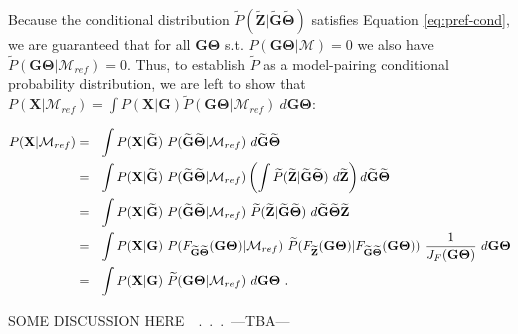 \documentclass[11pt]{article}
\newcommand{\vect}[1]{\boldsymbol{\mathbf{#1}}}
\newcommand{\ignore}[1]{}
\newcommand{\X}{\vect{X}}
\newcommand{\M}{\mathcal{M}}
\newcommand{\G}{\vect{G}}
\newcommand{\T}{\vect{\Theta}}
\newcommand{\GT}{\G\T}
\newcommand{\Mref}{\M_{ref}}
\newcommand{\Pref}{\widetilde{P}}
\newcommand{\GTref}{\widetilde{\GT}}
\newcommand{\Gref}{\widetilde{\G}}
\newcommand{\Tref}{\widetilde{\T}}
\newcommand{\Z}{\vect{Z}}
\newcommand{\Zref}{\widetilde{\Z}}
\begin{document}
Because the conditional distribution $\Pref(\Zref|\Gref\Tref)$ satisfies Equation \ref{eq:pref-cond},
we are guaranteed that for all $\GT$ s.t. $P(\GT|\M)=0$ we also have $\Pref(\GT|\Mref)=0$.
%
Thus, to establish $\Pref$ as a model-pairing conditional probability distribution, we are left to show that $P(\X|\Mref) = \int P(\X|\G) \Pref(\GT|\Mref)\ d\GT$:
%
%
\begin{small}
\begin{align}
P(\X|\Mref)
&=~~ \int P(\X|\Gref)\ P(\Gref\Tref|\Mref)\ d\Gref\Tref  \notag \\ %
&=~~ \int P(\X|\Gref)\ P(\Gref\Tref|\Mref)  %
\left( \int \Pref(\Zref|\Gref\Tref)\ d\Zref\right)d\Gref\Tref \notag \\ 
&=~~ \int P(\X|\Gref)\ P(\Gref\Tref|\Mref)\ \Pref(\Zref|\Gref\Tref)\ d\Gref\Tref\Zref \notag \\ 
&=~~ \int P(\X|\G)\ P(F_{\Gref\Tref}(\GT)|\Mref)\ \Pref(F_{\Zref}(\GT)|F_{\Gref\Tref}(\GT))\ \frac{1} {J_F(\GT)}\  d\GT \notag \\ 
&=~~ \int P(\X|\G)\ \Pref(\GT|\Mref)\ d\GT ~. \label{eq:likelihood_gen} %
\end{align}
\end{small}

SOME DISCUSSION HERE~~.\ .\ .\ ---TBA---
\ignore{
Assume first that we are interested in comparing our model of interest $\M$ to a reference model $\Mref$, which is a
{\em generalized} version of $\M$. This {\em generalization} is captured by a mapping $\Psi$ from the space of hidden
variables of $\M$ to the space of hidden variables of $\Mref$:~~ $\GTref = \Psi(\GT)$, such that if $P(\GT|\M)>0$,
then $P(\Psi(\GT)|\Mref)>0$. This implies that any instance of $\GT$ we sample in an MCMC given $\M$ will have positive
probability under the reference model (after mapping). Examples of generalizations and mappings are given later on,
but it is useful to think of a generalization as removing detail from the model (e.g., less population structure).
%
Our proposed importance sampling is based on the inverse map $\Psi^{-1}$, but the generalization mapping $\Psi$ will
typically not be invertible. This is because the reference model has less parameters and less detailed genealogical
information. To facilitate inversion, we append the reference model $\Mref$ with a series of additional hidden variables
($\Zref$), which are conditionally independent of the data $\X$ given $\GTref$. Consequently, $\Psi$ can be extended
an invertible mapping $\Psi'(\GT) = (\GTref,\Zref)$. We denote the Jacobian of this invertible mapping by $J_\Psi$,
and note that it will typically be equal to 1 (for most mappings that we will be discussing here).
%
Given the extended mapping $\Psi'$ and access to the posterior probability distribution of $\GT$ given $\X$ and
our assumed model $\M$, the {\em relative Bayes factor} can be estimated as follows:
}
\end{document}
